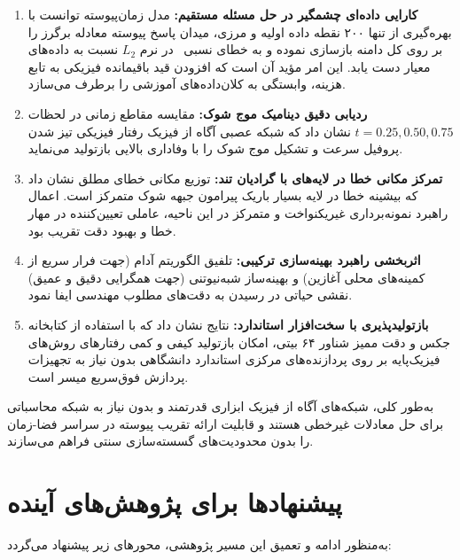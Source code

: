 \begin{enumerate}
\item \textbf{کارایی داده‌ای چشمگیر در حل مسئله مستقیم:} مدل زمان‌پیوسته توانست با بهره‌گیری از تنها ۲۰۰ نقطه داده اولیه و مرزی، میدان پاسخ پیوسته معادله برگرز را بر روی کل دامنه بازسازی نموده و به خطای نسبی \FwdRelErr\ در نرم $L_2$ نسبت به داده‌های معیار دست یابد. این امر مؤید آن است که افزودن قید باقیمانده فیزیکی به تابع هزینه، وابستگی به کلان‌داده‌های آموزشی را برطرف می‌سازد.

\item \textbf{ردیابی دقیق دینامیک موج شوک:} مقایسه مقاطع زمانی در لحظات $t=0.25, 0.50, 0.75$ نشان داد که شبکه عصبی آگاه از فیزیک رفتار فیزیکی تیز شدن پروفیل سرعت و تشکیل موج شوک را با وفاداری بالایی بازتولید می‌نماید.

\item \textbf{تمرکز مکانی خطا در لایه‌های با گرادیان تند:} توزیع مکانی خطای مطلق نشان داد که بیشینه خطا در لایه بسیار باریک پیرامون جبهه شوک متمرکز است. اعمال راهبرد نمونه‌برداری غیریکنواخت و متمرکز در این ناحیه، عاملی تعیین‌کننده در مهار خطا و بهبود دقت تقریب بود.

\item \textbf{اثربخشی راهبرد بهینه‌سازی ترکیبی:} تلفیق الگوریتم آدام (جهت فرار سریع از کمینه‌های محلی آغازین) و بهینه‌ساز شبه‌نیوتنی  (جهت همگرایی دقیق و عمیق) نقشی حیاتی در رسیدن به دقت‌های مطلوب مهندسی ایفا نمود.

\item \textbf{بازتولیدپذیری با سخت‌افزار استاندارد:} نتایج نشان داد که با استفاده از کتابخانه جکس و دقت ممیز شناور ۶۴ بیتی، امکان بازتولید کیفی و کمی رفتارهای روش‌های فیزیک‌پایه بر روی پردازنده‌های مرکزی استاندارد دانشگاهی بدون نیاز به تجهیزات پردازش فوق‌سریع میسر است.
\end{enumerate}

به‌طور کلی، شبکه‌های آگاه از فیزیک ابزاری قدرتمند و بدون نیاز به شبکه محاسباتی برای حل معادلات غیرخطی هستند و قابلیت ارائه تقریب پیوسته در سراسر فضا-زمان را بدون محدودیت‌های گسسته‌سازی سنتی فراهم می‌سازند.

\section{پیشنهادها برای پژوهش‌های آینده}
\label{sec:future}

به‌منظور ادامه و تعمیق این مسیر پژوهشی، محورهای زیر پیشنهاد می‌گردد:

